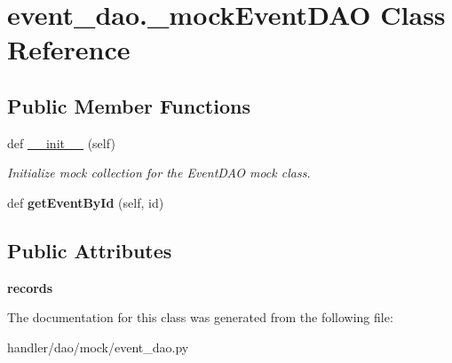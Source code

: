 \hypertarget{classevent__dao_1_1__mock_event_d_a_o}{}\section{event\+\_\+dao.\+\_\+mock\+Event\+D\+AO Class Reference}
\label{classevent__dao_1_1__mock_event_d_a_o}
\subsection*{Public Member Functions}
\begin{DoxyCompactItemize}
\item 
\mbox{\label{classevent__dao_1_1__mock_event_d_a_o_af692581b8c4bb00a4d5808a5ffe8783a}} 
def \hyperlink{classevent__dao_1_1__mock_event_d_a_o_af692581b8c4bb00a4d5808a5ffe8783a}{\+\_\+\+\_\+init\+\_\+\+\_\+} (self)
\begin{DoxyCompactList}\small\item\em Initialize mock collection for the Event\+D\+AO mock class. \end{DoxyCompactList}\item 
\mbox{\label{classevent__dao_1_1__mock_event_d_a_o_a69cc619582c79a19a10e86c7f15e2e68}} 
def {\bfseries get\+Event\+By\+Id} (self, id)
\end{DoxyCompactItemize}
\subsection*{Public Attributes}
\begin{DoxyCompactItemize}
\item 
\mbox{\label{classevent__dao_1_1__mock_event_d_a_o_ae5dc149b35df986b3782b08740d0cecd}} 
{\bfseries records}
\end{DoxyCompactItemize}


The documentation for this class was generated from the following file\+:\begin{DoxyCompactItemize}
\item 
handler/dao/mock/event\+\_\+dao.\+py\end{DoxyCompactItemize}
